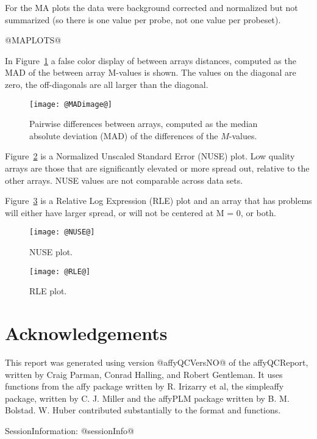 \documentclass[11pt]{article}
\newcommand{\Rpackage}[1]{{\textsf{#1}}}
\begin{document}
For the MA plots the data were background corrected and normalized 
but not summarized (so there is one value per probe, not one value
per probeset). 

@MAPLOTS@

In Figure~\ref{fig:MADimage} a false color display of between arrays
distances, computed as the MAD of the between array M-values is shown.
The values on the diagonal are zero, the off-diagonals are all larger
than the diagonal.

\begin{figure}[tp]
  \centering
\texttt{[image: @MADimage@]}
\caption{\label{fig:MADimage}%
Pairwise differences between arrays, computed as the median absolute 
deviation (MAD) of the differences of the $M$-values.}
\end{figure}

Figure~\ref{fig:NUSE} is a Normalized Unscaled Standard Error (NUSE) 
plot.  Low quality arrays are those that are significantly elevated or 
more spread out, relative to the other arrays.
NUSE values are not comparable across data sets.

Figure~\ref{fig:RLE} is a Relative Log Expression (RLE) plot
and an array that has problems will either have larger spread, or 
will not be centered at M = 0, or both.

\begin{figure}[tp]
  \centering
\texttt{[image: @NUSE@]}
\caption{\label{fig:NUSE}%
NUSE plot.}
\end{figure}

\begin{figure}[tp]
  \centering
\texttt{[image: @RLE@]}
\caption{\label{fig:RLE}%
RLE plot.}
\end{figure}

\section*{Acknowledgements}
\label{sec:ack}

This report was generated using version @affyQCVersNO@ of the 
\Rpackage{affyQCReport}, written by Craig Parman, Conrad Halling, and
Robert Gentleman. It uses functions from the \Rpackage{affy} package
written by R. Irizarry et al, the \Rpackage{simpleaffy} package, written
by C. J. Miller and the \Rpackage{affyPLM} package written by B. M. Bolstad.
W. Huber contributed substantially to the format and functions.

SessionInformation: 
@sessionInfo@
\end{document}
